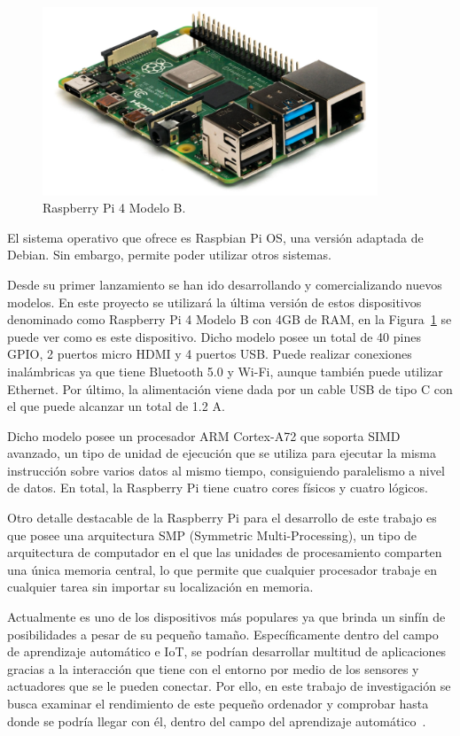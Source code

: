 \documentclass[a4paper, 12pt]{book}
\begin{document}
\begin{figure}[htb]
  \centering
  \includegraphics[width=10cm, keepaspectratio]{img/real_raspberry.png}
  \caption{Raspberry Pi 4 Modelo B.}\label{fig:raspberry_pi}
\end{figure}

El sistema operativo que ofrece es Raspbian Pi OS, una versión adaptada de Debian. Sin embargo, permite poder utilizar otros sistemas.

Desde su primer lanzamiento se han ido desarrollando y comercializando nuevos modelos. En este proyecto se utilizará la última versión de estos dispositivos denominado como Raspberry Pi 4 Modelo B con 4GB de RAM, en la Figura~\ref{fig:raspberry_pi} se puede ver como es este dispositivo. Dicho modelo posee un total de 40 pines GPIO, 2 puertos micro HDMI y 4 puertos USB. Puede realizar conexiones inalámbricas ya que tiene Bluetooth 5.0 y Wi-Fi, aunque también puede utilizar Ethernet. Por último, la alimentación viene dada por un cable USB de tipo C con el que puede alcanzar un total de 1.2 A.

Dicho modelo posee un procesador ARM Cortex-A72 que soporta SIMD avanzado, un tipo de unidad de ejecución que se utiliza para ejecutar la misma instrucción sobre varios datos al mismo tiempo, consiguiendo paralelismo a nivel de datos. En total, la Raspberry Pi tiene cuatro cores físicos y cuatro lógicos. 

Otro detalle destacable de la Raspberry Pi para el desarrollo de este trabajo es que posee una arquitectura SMP (Symmetric Multi-Processing), un tipo de arquitectura de computador en el que las unidades de procesamiento comparten una única memoria central, lo que permite que cualquier procesador trabaje en cualquier tarea sin importar su localización en memoria. 

Actualmente es uno de los dispositivos más populares ya que brinda un sinfín de posibilidades a pesar de su pequeño tamaño. Específicamente dentro del campo de aprendizaje automático e IoT, se podrían desarrollar multitud de aplicaciones gracias a la interacción que tiene con el entorno por medio de los sensores y actuadores que se le pueden conectar. Por ello, en este trabajo de investigación se busca examinar el rendimiento de este pequeño ordenador y comprobar hasta donde se podría llegar con él, dentro del campo del aprendizaje automático~\cite{Garcia-Martin2019}. 
\end{document}
